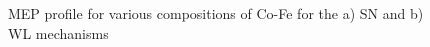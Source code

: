 \documentclass[preprint]{elsarticle}
\begin{document}
\begin{figure}[htp!]%
    \centering
\caption{MEP profile for various compositions of Co-Fe for the a) SN and b) WL mechanisms}
\label{fig:linear_profile_Co_Fe}
  \end{figure} 
\end{document}
